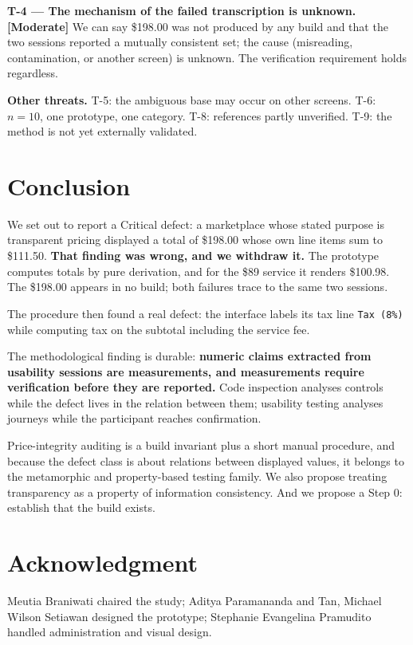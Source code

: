 \documentclass[conference]{IEEEtran}
\begin{document}
\textbf{T-4 --- The mechanism of the failed transcription is unknown. [Moderate]} We can say \$198.00 was
not produced by any build and that the two sessions reported a mutually consistent set; the cause
(misreading, contamination, or another screen) is unknown. The verification requirement holds
regardless.

\textbf{Other threats.} T-5: the ambiguous base may occur on other screens. T-6: $n = 10$, one
prototype, one category. T-8: references partly unverified. T-9: the method is not yet externally
validated.

\section{Conclusion}

We set out to report a Critical defect: a marketplace whose stated purpose is transparent pricing
displayed a total of \$198.00 whose own line items sum to \$111.50. \textbf{That finding was wrong, and we
withdraw it.} The prototype computes totals by pure derivation, and for the \$89 service it renders
\$100.98. The \$198.00 appears in no build; both failures trace to the same two sessions.

The procedure then found a real defect: the interface labels its tax line \texttt{Tax (8\%)} while
computing tax on the subtotal including the service fee.

The methodological finding is durable: \textbf{numeric claims extracted from usability sessions are
measurements, and measurements require verification before they are reported.} Code inspection analyses
controls while the defect lives in the relation between them; usability testing analyses journeys
while the participant reaches confirmation.

Price-integrity auditing is a build invariant plus a short manual procedure, and because the defect
class is about relations between displayed values, it belongs to the metamorphic and property-based
testing family. We also propose treating transparency as a property of information consistency. And we
propose a Step 0: establish that the build exists.

\section*{Acknowledgment}

Meutia Braniwati chaired the study; Aditya Paramananda and Tan, Michael Wilson Setiawan designed the
prototype; Stephanie Evangelina Pramudito handled administration and visual design.
\end{document}
